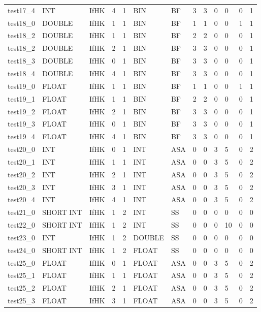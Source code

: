 \begin{longtable}{|l|l|l|p{0.5cm}|p{0.5cm}|l|p{0.5cm}|p{0.5cm}|p{0.5cm}|l|l|p{0.5cm}|l|}
test17\_4 & INT & IfHK & 4 & 1 & BIN & BF & 3 & 3 & 0 & 0 & 0 & 1 \\
test18\_0 & DOUBLE & IfHK & 1 & 1 & BIN & BF & 1 & 1 & 0 & 0 & 1 & 1 \\
test18\_2 & DOUBLE & IfHK & 1 & 1 & BIN & BF & 2 & 2 & 0 & 0 & 0 & 1 \\
test18\_2 & DOUBLE & IfHK & 2 & 1 & BIN & BF & 3 & 3 & 0 & 0 & 0 & 1 \\
test18\_3 & DOUBLE & IfHK & 0 & 1 & BIN & BF & 3 & 3 & 0 & 0 & 0 & 1 \\
test18\_4 & DOUBLE & IfHK & 4 & 1 & BIN & BF & 3 & 3 & 0 & 0 & 0 & 1 \\
test19\_0 & FLOAT & IfHK & 1 & 1 & BIN & BF & 1 & 1 & 0 & 0 & 1 & 1 \\
test19\_1 & FLOAT & IfHK & 1 & 1 & BIN & BF & 2 & 2 & 0 & 0 & 0 & 1 \\
test19\_2 & FLOAT & IfHK & 2 & 1 & BIN & BF & 3 & 3 & 0 & 0 & 0 & 1 \\
test19\_3 & FLOAT & IfHK & 0 & 1 & BIN & BF & 3 & 3 & 0 & 0 & 0 & 1 \\
test19\_4 & FLOAT & IfHK & 4 & 1 & BIN & BF & 3 & 3 & 0 & 0 & 0 & 1 \\
test20\_0 & INT & IfHK & 0 & 1 & INT & ASA & 0 & 0 & 3 & 5 & 0 & 2 \\
test20\_1 & INT & IfHK & 1 & 1 & INT & ASA & 0 & 0 & 3 & 5 & 0 & 2 \\
test20\_2 & INT & IfHK & 2 & 1 & INT & ASA & 0 & 0 & 3 & 5 & 0 & 2 \\
test20\_3 & INT & IfHK & 3 & 1 & INT & ASA & 0 & 0 & 3 & 5 & 0 & 2 \\
test20\_4 & INT & IfHK & 4 & 1 & INT & ASA & 0 & 0 & 3 & 5 & 0 & 2 \\
test21\_0 & SHORT INT & IfHK & 1 & 2 & INT & SS & 0 & 0 & 0 & 0 & 0 & 0 \\
test22\_0 & SHORT INT & IfHK & 1 & 2 & INT & SS & 0 & 0 & 0 & 10 & 0 & 0 \\
test23\_0 & INT & IfHK & 1 & 2 & DOUBLE & SS & 0 & 0 & 0 & 0 & 0 & 0 \\
test24\_0 & SHORT INT & IfHK & 1 & 2 & FLOAT & SS & 0 & 0 & 0 & 0 & 0 & 0 \\
test25\_0 & FLOAT & IfHK & 0 & 1 & FLOAT & ASA & 0 & 0 & 3 & 5 & 0 & 2 \\
test25\_1 & FLOAT & IfHK & 1 & 1 & FLOAT & ASA & 0 & 0 & 3 & 5 & 0 & 2 \\
test25\_2 & FLOAT & IfHK & 2 & 1 & FLOAT & ASA & 0 & 0 & 3 & 5 & 0 & 2 \\
test25\_3 & FLOAT & IfHK & 3 & 1 & FLOAT & ASA & 0 & 0 & 3 & 5 & 0 & 2 \\

\end{longtable}
